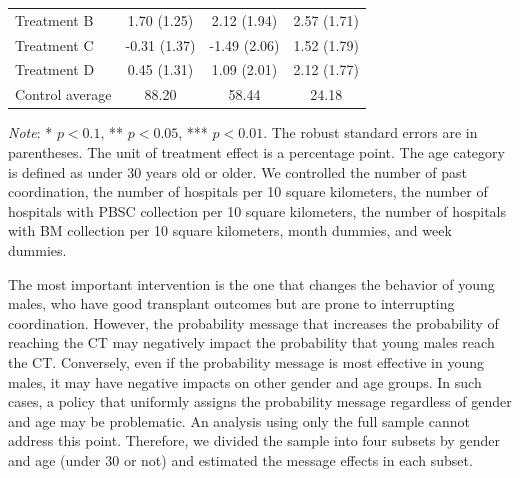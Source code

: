 \documentclass[12pt, a4paper]{article}
\begin{document}
\begin{table}
\begin{threeparttable}
\begin{tabular}[t]{lccc}
\hspace{1em}Treatment B & 1.70 (1.25) & 2.12 (1.94) & 2.57 (1.71)\\
\hspace{1em}Treatment C & -0.31 (1.37) & -1.49 (2.06) & 1.52 (1.79)\\
\hspace{1em}Treatment D & 0.45 (1.31) & 1.09 (2.01) & 2.12 (1.77)\\
\hspace{1em}Control average & 88.20 & 58.44 & 24.18\\
\bottomrule
\end{tabular}
\begin{tablenotes}
\item \emph{Note}: * $p < 0.1$, ** $p < 0.05$, *** $p < 0.01$. The robust standard errors are in parentheses. The unit of treatment effect is a percentage point. The age category is defined as under 30 years old or older. We controlled the number of past coordination, the number of hospitals per 10 square kilometers, the number of hospitals with PBSC collection per 10 square kilometers, the number of hospitals with BM collection per 10 square kilometers, month dummies, and week dummies.
\end{tablenotes}
\end{threeparttable}
\end{table}

The most important intervention is the one that changes the behavior of young males, who have good transplant outcomes but are prone to interrupting coordination. However, the probability message that increases the probability of reaching the CT may negatively impact the probability that young males reach the CT. Conversely, even if the probability message is most effective in young males, it may have negative impacts on other gender and age groups. In such cases, a policy that uniformly assigns the probability message regardless of gender and age may be problematic. An analysis using only the full sample cannot address this point. Therefore, we divided the sample into four subsets by gender and age (under 30 or not) and estimated the message effects in each subset.
\end{document}
